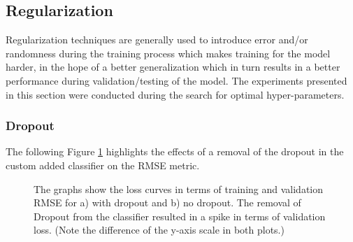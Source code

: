 \subsection{Regularization}
Regularization techniques are generally used to introduce error and/or randomness during the training process which makes training for the model harder, in the hope of a better generalization which in turn results in a better performance during validation/testing of the model. The experiments presented in this section were conducted during the search for optimal hyper-parameters.

\subsubsection{Dropout}
The following Figure \ref{fig:AblationNoDropout} highlights the effects of a removal of the dropout in the custom added classifier on the RMSE metric.\newline

\begin{figure}[htbp]
  \centering
  \hfill
  \caption[Ablation Study: Dropout loss curve]{The graphs show the loss curves in terms of training and validation RMSE for a) with dropout and b) no dropout. The removal of Dropout from the classifier resulted in a spike in terms of validation loss. (Note the difference of the y-axis scale in both plots.)}
  \label{fig:AblationNoDropout}
\end{figure}

